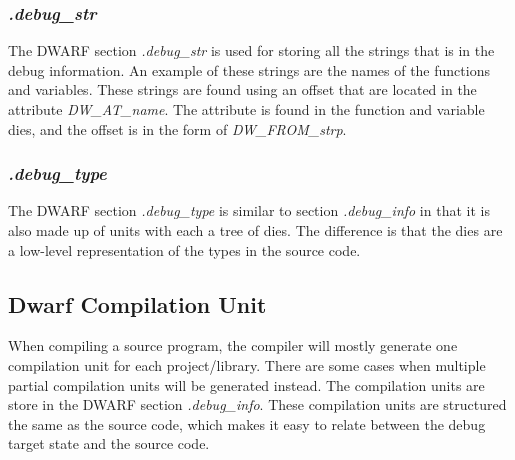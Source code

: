 \subsubsection{\emph{.debug\_str}}
The \gls{DWARF} section \emph{.debug\_str} is used for storing all the strings that is in the debug information.
An example of these strings are the names of the functions and variables.
These strings are found using an offset that are located in the attribute \emph{DW\_AT\_name}.
The attribute is found in the function and variable \glspl{die}, and the offset is in the form of \emph{DW\_FROM\_strp}.


\subsubsection{\emph{.debug\_type}}
The \gls{DWARF} section \emph{.debug\_type} is similar to section \emph{.debug\_info} in that it is also made up of units with each a tree of \glspl{die}.
The difference is that the \glspl{die} are a low-level representation of the types in the source code.



\subsection{Dwarf Compilation Unit}
 


When compiling a source program, the compiler will mostly generate one compilation unit for each project/library.
There are some cases when multiple partial compilation units will be generated instead.
The compilation units are store in the \gls{DWARF} section \emph{.debug\_info}.
These compilation units are structured the same as the source code, which makes it easy to relate between the debug target state and the source code.


